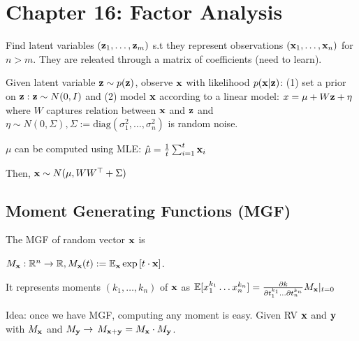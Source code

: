 \section*{Chapter 16: Factor Analysis}
Find latent variables $(\mathbf{z}_1, \hdots, \mathbf{z}_m)$ s.t they represent observations $(\mathbf{x}_1, \hdots, \mathbf{x}_n)$ for $n>m$. They are releated through a matrix of coefficients (need to learn).

Given latent variable $\mathbf{z} \sim p(\mathbf{z})$, observe $\mathbf{x}$ with likelihood $p(\mathbf{x}|\mathbf{z})$: (1) set a prior on $\mathbf{z}: \mathbf{z}\sim N(0, I)$ and (2) model $\mathbf{x}$ according to a linear model: $x = \mu + W\mathbf{z} + \eta$ where $W$ captures relation between $\mathbf{x}$ and $\mathbf{z}$ and $\eta \sim N(0, \Sigma), \Sigma:=\text{diag}(\sigma_1^2, \hdots, \sigma_n^2)$ is random noise.

$\mu$ can be computed using MLE: $\hat\mu = \frac{1}{t}\sum_{i=1}^t\mathbf{x}_i$

Then, $\mathbf{x} \sim N(\mu, WW^\top + \Sigma)$

\subsection*{Moment Generating Functions (MGF)}
The MGF of random vector $\mathbf{x}$ is 

$M_{\mathbf{x}} : \mathbb{R}^n \to \mathbb{R}, M_{\mathbf{x}}(t):= \mathbb{E}_{\mathbf{x}}\exp{[t\cdot\mathbf{x}]}$.

It represents moments $(k_1, \hdots, k_n)$ of $\mathbf{x}$ as $\mathbb{E}[x_1^{k_1} \hdots x_n^{k_n}] = \frac{\partial k}{\partial t_1^{k_1} \hdots \partial t_n^{k_n}}M_{\mathbf{x}} |_{t=0}$ 

Idea: once we have MGF, computing any moment is easy. Given RV $\mathbf{x}$ and $\mathbf{y}$ with $M_{\mathbf{x}}$ and $M_{\mathbf{y}} \to$ $M_{\mathbf{x}+\mathbf{y}} = M_{\mathbf{x}} \cdot M_{\mathbf{y}}$.